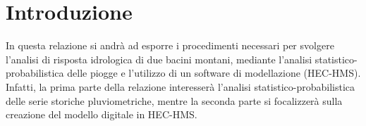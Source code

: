 \section{Introduzione}
In questa relazione si andrà ad esporre i procedimenti necessari per svolgere l'analisi di risposta idrologica di due bacini montani, mediante l'analisi statistico-probabilistica delle piogge e l'utilizzo di un software di modellazione (HEC-HMS).\\
Infatti, la prima parte della relazione interesserà l'analisi statistico-probabilistica delle serie storiche pluviometriche, mentre la seconda parte si focalizzerà sulla creazione del modello digitale in HEC-HMS.